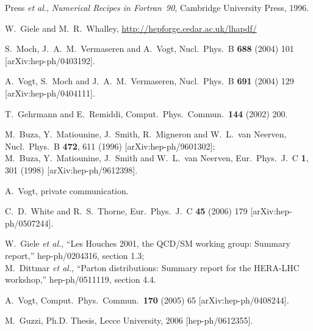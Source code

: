 \documentclass[12pt]{article}
\begin{document}
\begin{thebibliography}{99}
  Press {\it et al.}, \emph{Numerical Recipes in Fortran~90},
  Cambridge University Press, 1996.

 W.~Giele and M.~R.~Whalley,
\url{http://hepforge.cedar.ac.uk/lhapdf/}


  S.~Moch, J.~A.~M.~Vermaseren and A.~Vogt,
  Nucl.\ Phys.\ B {\bf 688} (2004) 101
  [arXiv:hep-ph/0403192].

  A.~Vogt, S.~Moch and J.~A.~M.~Vermaseren,
  Nucl.\ Phys.\ B {\bf 691} (2004) 129
  [arXiv:hep-ph/0404111].


  T.~Gehrmann and E.~Remiddi,
  Comput.\ Phys.\ Commun.\  {\bf 144} (2002) 200.


  M.~Buza, Y.~Matiounine, J.~Smith, R.~Migneron and W.~L.~van Neerven,
  Nucl.\ Phys.\ B {\bf 472}, 611 (1996)
  [arXiv:hep-ph/9601302];\\
%
  M.~Buza, Y.~Matiounine, J.~Smith and W.~L.~van Neerven,
  Eur.\ Phys.\ J.\ C {\bf 1}, 301 (1998)
  [arXiv:hep-ph/9612398].
  
 A.~Vogt, private communication.


  C.~D.~White and R.~S.~Thorne,
  Eur.\ Phys.\ J.\ C {\bf 45} (2006) 179
  [arXiv:hep-ph/0507244].

  W.~Giele {\it et al.},
  ``Les Houches 2001, the QCD/SM working group: Summary report,''
  hep-ph/0204316, section 1.3;\\
  M.~Dittmar {\it et al.},
  ``Parton distributions: Summary report for the HERA-LHC workshop,''
  hep-ph/0511119, section 4.4.


  A.~Vogt,
  Comput.\ Phys.\ Commun.\  {\bf 170} (2005) 65
  [arXiv:hep-ph/0408244].


  M.~Guzzi, Ph.D. Thesis, Lecce University, 2006 [hep-ph/0612355].
\end{thebibliography}
\end{document}
